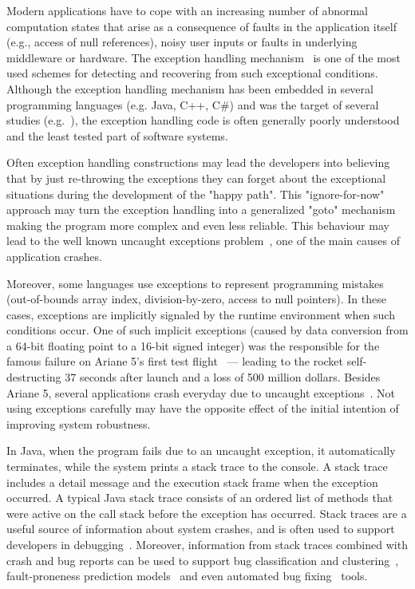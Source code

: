 \documentclass[conference]{IEEEtran}
\begin{document}
Modern applications have to cope with an increasing number of abnormal
computation states that arise as a consequence of faults in the application
itself (e.g., access of null references), noisy user inputs or faults in
underlying middleware or hardware. The exception handling
mechanism~\cite{goodenough1975exception} is one of the most used schemes for
detecting and recovering from such exceptional conditions. Although the
exception handling mechanism has been embedded in several programming languages
(e.g. Java, C++, C\#) and was the target of several studies
(e.g.~\cite{miller1997issues,Robil00,shah2010understanding,
garcia2007extracting,garcia2001comparative,cabral2007exception,coelho2011unveiling}),
the exception handling code is often generally poorly understood and the least
tested part of software systems.

Often exception handling constructions may lead the developers into believing that
by just re-throwing the exceptions they can forget about the exceptional
situations during the development of the "happy path". This "ignore-for-now"
approach may turn the exception handling into a generalized "goto"
mechanism~\cite{mandrioli1992advances} making the program more complex and even
less reliable. This behaviour may lead to the well known uncaught exceptions
problem~\cite{jo2004uncaught}, one of the main causes of application crashes.

Moreover, some languages use exceptions to represent programming mistakes
(out-of-bounds array index, division-by-zero, access to null pointers). In these cases,
exceptions are implicitly signaled by the runtime environment when such
conditions occur. One of such implicit exceptions (caused by data conversion
from a 64-bit floating point to a 16-bit signed integer) was the responsible for
the famous failure on Ariane 5's first test flight~\cite{lions1996ariane} ---
leading to the rocket self-destructing 37 seconds after launch and a loss of 500
million dollars. Besides Ariane 5, several applications crash everyday due to
uncaught exceptions~\cite{jo2004uncaught}. Not using exceptions carefully
may have the opposite effect of the initial intention of improving
system robustness.

In Java, when the program fails due to an uncaught exception, it automatically
terminates, while the system prints a stack trace to the console. A stack trace
includes a detail message and the execution stack frame when the exception
occurred. A typical Java stack trace consists of an ordered list of methods that
were active on the call stack before the exception has occurred. Stack traces
are a useful source of information about system crashes, and is often used to
support developers in debugging~\cite{schroter2010stack}. Moreover, information
from stack traces combined with crash and bug reports can be used to support bug
classification and clustering~\cite{wang2013improving, kim2011crash,
dhaliwal2011classifying}, fault-proneness prediction
models~\cite{kim2013predicting} and even automated bug
fixing~\cite{sinha2009fault} tools.
\end{document}
